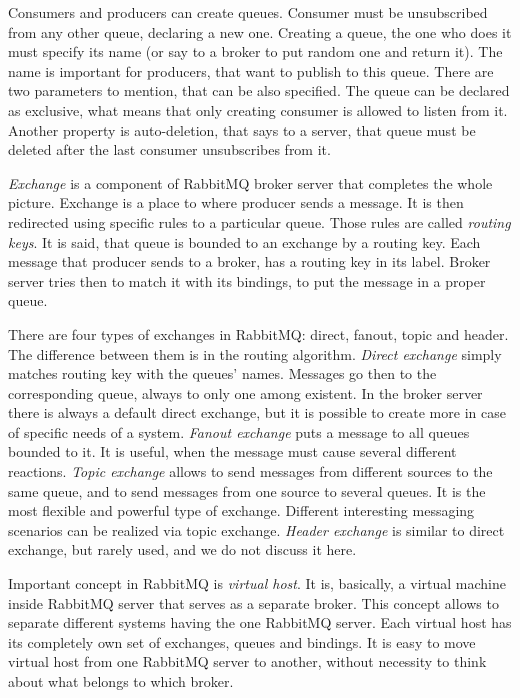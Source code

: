 Consumers and producers can create queues.
Consumer must be unsubscribed from any other queue, declaring a new one.
Creating a queue, the one who does it must specify its name (or say to a broker to put random one and return it).
The name is important for producers, that want to publish to this queue.
There are two parameters to mention, that can be also specified.
The queue can be declared as exclusive, what means that only creating consumer is allowed to listen from it.
Another property is auto-deletion, that says to a server, that queue must be deleted after the last consumer unsubscribes from it.

\textit{Exchange}  is a component of RabbitMQ broker server that completes the whole picture.
Exchange is a place to where producer sends a message.
It is then redirected using specific rules to a particular queue.
Those rules are called \textit{routing keys}.
It is said, that queue is bounded to an exchange by a routing key.
Each message that producer sends to a broker, has a routing key in its label.
Broker server tries then to match it with its bindings, to put the message in a proper queue.

There are four types of exchanges in RabbitMQ: direct, fanout, topic and header.
The difference between them is in the routing algorithm.
\textit{Direct exchange} simply matches routing key with the queues' names.
Messages go then to the corresponding queue, always to only one among existent.
In the broker server there is always a default direct exchange, but it is possible to create more in case of specific needs of a system.
\textit{Fanout exchange} puts a message to all queues bounded to it.
It is useful, when the message must cause several different reactions.
\textit{Topic exchange} allows to send messages from different sources to the same queue, and to send messages from one source to several queues.
It is the most flexible and powerful type of exchange.
Different interesting messaging scenarios can be realized via topic exchange.
\textit{Header exchange} is similar to direct exchange, but rarely used, and we do not discuss it here.

Important concept in RabbitMQ is \textit{virtual host}.
It is, basically, a virtual machine inside RabbitMQ server that serves as a separate broker.
This concept allows to separate different systems having the one RabbitMQ server.
Each virtual host has its completely own set of exchanges, queues and bindings.
It is easy to move virtual host from one RabbitMQ server to another, without necessity to think about what belongs to which broker.

